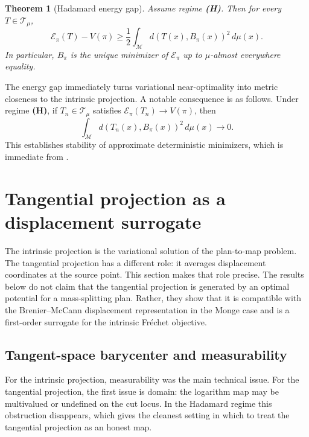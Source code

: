 \documentclass[10pt]{article} %
\newtheorem{theorem}{Theorem}
\theoremstyle{definition}
\providecommand{\1}{\mathbf{1}}
\providecommand{\sM}{\mathcal{M}}
\begin{document}
\begin{theorem}[Hadamard energy gap]
\label{thm:hadamard_gap}
Assume regime \textbf{(H)}. Then for every $T\in\mathcal T_\mu$,
\[
\mathcal E_\pi(T)-V(\pi)
\ge
\frac12\int_{\sM} d(T(x),B_\pi(x))^2\,d\mu(x).
\]
In particular, $B_\pi$ is the unique minimizer of $\mathcal E_\pi$ up to $\mu$-almost everywhere equality.
\end{theorem}



The energy gap immediately turns variational near-optimality into metric closeness to the intrinsic projection. A notable consequence is as follows. Under regime \textbf{(H)}, if $T_n\in\mathcal T_\mu$ satisfies $\mathcal E_\pi(T_n)\to V(\pi)$, then 
\begin{equation*}
    \int_{\sM} d(T_n(x),B_\pi(x))^2\,d\mu(x)\to 0.
\end{equation*}
This establishes stability of approximate deterministic minimizers, which is immediate from .




\section{Tangential projection as a displacement surrogate}
\label{sec:tangent}

The intrinsic projection is the variational solution of the plan-to-map problem. The tangential projection has a different role: it averages displacement coordinates at the source point. This section makes that role precise. The results below do not claim that the tangential projection is generated by an optimal potential for a mass-splitting plan. Rather, they show that it is compatible with the Brenier--McCann displacement representation in the Monge case and is a first-order surrogate for the intrinsic Fr\'echet objective.

\subsection{Tangent-space barycenter and measurability}

For the intrinsic projection, measurability was the main technical issue. For the tangential projection, the first issue is domain: the logarithm map may be multivalued or undefined on the cut locus. In the Hadamard regime this obstruction disappears, which gives the cleanest setting in which to treat the tangential projection as an honest map.
\end{document}
